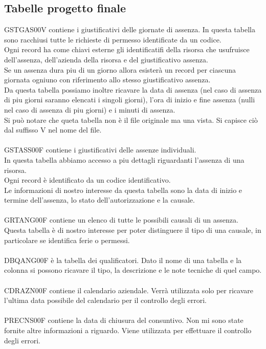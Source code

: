 \documentclass[target=bach,aauheader=,style=]{thud}
\begin{document}
\subsection{Tabelle progetto finale}
GSTGAS00V contiene i giustificativi delle giornate di assenza. In questa tabella sono racchiusi tutte le richieste di permesso identificate da un codice.
\\Ogni record ha come chiavi esterne gli identificatifi della risorsa che usufruisce dell'assenza, dell'azienda della risorsa e del giustificativo assenza.
\\Se un assenza dura piu di un giorno allora esisterà un record per ciascuna giornata ogniuno con riferimento allo stesso giustificativo assenza.
\\Da questa tabella possiamo inoltre ricavare la data di assenza (nel caso di assenza di piu giorni saranno elencati i singoli giorni), l'ora di inizio e fine assenza (nulli nel caso di assenza di piu giorni) e i minuti di assenza.
\\Si può notare che queta tabella non è il file originale ma una vista. Si capisce ciò dal suffisso V nel nome del file. 
\\
\\GSTASS00F contiene i giustificativi delle assenze individuali.
\\In questa tabella abbiamo accesso a piu dettagli riguardanti l'assenza di una risorsa.
\\Ogni record è identificato da un codice identificativo.
\\Le informazioni di nostro interesse da questa tabella sono la data di inizio e termine dell'assenza, lo stato dell'autorizzazione e la causale.
\\
\\GRTANG00F contiene un elenco di tutte le possibili causali di un assenza.
\\Questa tabella è di nostro interesse per poter distinguere il tipo di una causale, in particolare se identifica ferie o permessi.
\\
\\DBQANG00F è la tabella dei qualificatori. Dato il nome di una tabella e la colonna si possono ricavare il tipo, la descrizione e le note tecniche di quel campo.
\\
\\CDRAZN00F contiene il calendario aziendale. Verrà utilizzata solo per ricavare l'ultima data possibile del calendario per il controllo degli errori.
\\
\\PRECNS00F contiene la data di chiusura del consuntivo. Non mi sono state fornite altre informazioni a riguardo. Viene utilizzata per effettuare il controllo degli errori.
\end{document}
